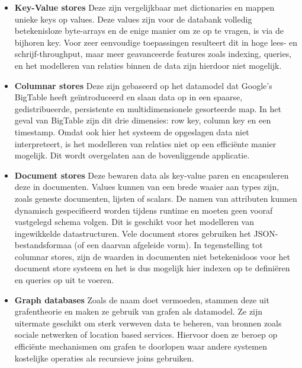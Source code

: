 \begin{itemize}
\item \textbf{Key-Value stores} Deze zijn vergelijkbaar met dictionaries en mappen unieke keys op values. Deze values zijn voor de databank volledig betekenisloze byte-arrays en de enige manier om ze op te vragen, is via de bijhoren key. Voor zeer eenvoudige toepassingen resulteert dit in hoge lees- en schrijf-throughput, maar meer geavanceerde features zoals indexing, queries, en het modelleren van relaties binnen de data zijn hierdoor niet mogelijk\cite{hecht2011nosql}\cite{grolinger2013data}.

\item \textbf{Columnar stores} Deze zijn gebaseerd op het datamodel dat Google's BigTable heeft ge\"introduceerd en slaan data op in een spaarse, gedistribueerde, persistente en multidimensionele gesorteerde map\cite{chang2008bigtable}. In het geval van BigTable zijn dit drie dimensies: row key, column key en een timestamp. Omdat ook hier het systeem de opgeslagen data niet interpreteert, is het modelleren van relaties niet op een effici\"ente manier mogelijk. Dit wordt overgelaten aan de bovenliggende applicatie\cite{hecht2011nosql}.

\item \textbf{Document stores} Deze bewaren data als key-value paren en encapsuleren deze in documenten. Values kunnen van een brede waaier aan types zijn, zoals geneste documenten, lijsten of scalars. De namen van attributen kunnen dynamisch gespecifieerd worden tijdens runtime en moeten geen vooraf vastgelegd schema volgen\cite{cattell2011scalable}. Dit is geschikt voor het modelleren van ingewikkelde datastructuren. Vele document stores gebruiken het JSON-bestandsformaa (of een daarvan afgeleide vorm). In tegenstelling tot columnar stores, zijn de waarden in documenten niet betekenisloos voor het document store systeem en het is dus mogelijk hier indexen op te defini\"eren en queries op uit te voeren\cite{hecht2011nosql}.

\item \textbf{Graph databases} Zoals de naam doet vermoeden, stammen deze uit grafentheorie en maken ze gebruik van grafen als datamodel. Ze zijn uitermate geschikt om sterk verweven data te beheren, van bronnen zoals sociale netwerken of location based services. Hiervoor doen ze beroep op effici\"ente mechanismen om grafen te doorlopen waar andere systemen kostelijke operaties als recursieve joins gebruiken\cite{hecht2011nosql}.

\end{itemize}

